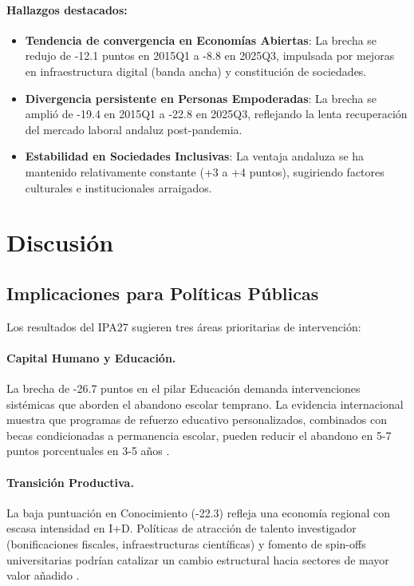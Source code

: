 \documentclass[authoryear,12pt]{elsarticle}
\begin{document}
\paragraph{Hallazgos destacados:}
\begin{itemize}
    \item \textbf{Tendencia de convergencia en Economías Abiertas}: La brecha se redujo de -12.1 puntos en 2015Q1 a -8.8 en 2025Q3, impulsada por mejoras en infraestructura digital (banda ancha) y constitución de sociedades.

    \item \textbf{Divergencia persistente en Personas Empoderadas}: La brecha se amplió de -19.4 en 2015Q1 a -22.8 en 2025Q3, reflejando la lenta recuperación del mercado laboral andaluz post-pandemia.

    \item \textbf{Estabilidad en Sociedades Inclusivas}: La ventaja andaluza se ha mantenido relativamente constante (+3 a +4 puntos), sugiriendo factores culturales e institucionales arraigados.
\end{itemize}

\section{Discusión}

\subsection{Implicaciones para Políticas Públicas}

Los resultados del IPA27 sugieren tres áreas prioritarias de intervención:

\paragraph{Capital Humano y Educación.} La brecha de -26.7 puntos en el pilar Educación demanda intervenciones sistémicas que aborden el abandono escolar temprano. La evidencia internacional muestra que programas de refuerzo educativo personalizados, combinados con becas condicionadas a permanencia escolar, pueden reducir el abandono en 5-7 puntos porcentuales en 3-5 años \citep{heckman2006skill}.

\paragraph{Transición Productiva.} La baja puntuación en Conocimiento (-22.3) refleja una economía regional con escasa intensidad en I+D. Políticas de atracción de talento investigador (bonificaciones fiscales, infraestructuras científicas) y fomento de spin-offs universitarias podrían catalizar un cambio estructural hacia sectores de mayor valor añadido \citep{rodriguez2010innovation}.
\end{document}
